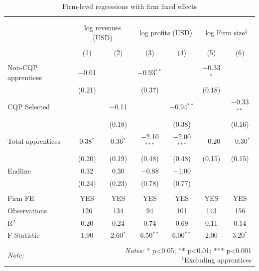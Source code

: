 \documentclass[
  11pt,
a4paper
]{report}
\begin{document}
\begin{landscape}
\end{landscape}

\begin{table}[H] \centering 
  \caption{Firm-level regressions with firm fixed effects} 
  \label{tab:firmregsfe} 
\begin{tabular}{@{\extracolsep{5pt}}lcccccc} 
\\[-1.8ex]\hline 
\hline \\[-1.8ex] 
\\[-1.8ex] & \multicolumn{2}{c}{log revenues (USD)} & \multicolumn{2}{c}{log profits (USD)} & \multicolumn{2}{c}{log Firm size$^1$} \\ 
\\[-1.8ex] & (1) & (2) & (3) & (4) & (5) & (6)\\ 
\hline \\[-1.8ex] 
 Non-CQP apprentices & $-$0.01 &  & $-$0.93$^{**}$ &  & $-$0.33$^{*}$ &  \\ 
  & (0.21) &  & (0.37) &  & (0.18) &  \\ 
  CQP Selected &  & $-$0.11 &  & $-$0.94$^{**}$ &  & $-$0.33$^{**}$ \\ 
  &  & (0.18) &  & (0.38) &  & (0.16) \\ 
  Total apprentices & 0.38$^{*}$ & 0.36$^{*}$ & $-$2.10$^{***}$ & $-$2.00$^{***}$ & $-$0.20 & $-$0.30$^{*}$ \\ 
  & (0.20) & (0.19) & (0.48) & (0.48) & (0.15) & (0.15) \\ 
  Endline & 0.32 & 0.30 & $-$0.88 & $-$1.00 &  &  \\ 
  & (0.24) & (0.23) & (0.78) & (0.77) &  &  \\ 
 \hline \\[-1.8ex] 
Firm FE & YES & YES & YES & YES & YES & YES \\ 
Observations & 126 & 134 & 94 & 101 & 143 & 156 \\ 
R$^{2}$ & 0.20 & 0.24 & 0.74 & 0.69 & 0.11 & 0.14 \\ 
F Statistic & 1.90 & 2.60$^{*}$ & 6.50$^{**}$ & 6.00$^{**}$ & 2.00 & 3.20$^{*}$ \\ 
\hline 
\hline \\[-1.8ex] 
\textit{Note:}  & \multicolumn{6}{r}{\parbox[t]{\textwidth}{\textit{Notes:} * p<0.05; ** p<0.01; *** p<0.001 \\ $^1$Excluding apprentices}} \\ 
\end{tabular} 
\end{table}
\end{document}
